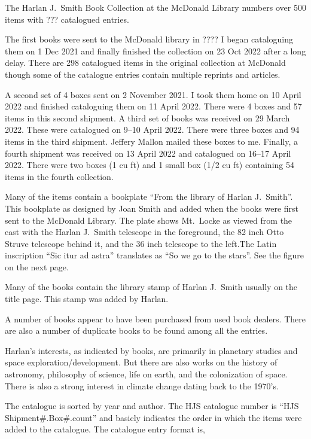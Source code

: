 The Harlan J.~Smith Book Collection at the McDonald Library
numbers over 500 items with ??? catalogued entries.

The first books were sent to the McDonald library in ????  I began
cataloguing them on 1 Dec 2021 and finally finished the collection on
23 Oct 2022 after a long delay. There are 298 catalogued items in the
original collection at McDonald though some of the catalogue entries
contain multiple reprints and articles.

A second set of 4 boxes sent on 2 November 2021.  I took them home on
10 April 2022 and finished cataloguing them on 11 April 2022. There
were 4 boxes and 57 items in this second shipment. A third set of
books was received on 29 March 2022. These were catalogued on 9--10 April
2022. There were three boxes and 94 items in the third
shipment. Jeffery Mallon mailed these boxes to me. Finally, a fourth
shipment was received on 13 April 2022 and catalogued on 16--17 April
2022. There were two boxes (1 cu ft) and 1 small box (1/2 cu ft)
containing 54 items in the fourth collection.

Many of the items contain a bookplate ``From the library of Harlan
J.~Smith''.  This bookplate as designed by Joan Smith and added when
the books were first sent to the McDonald Library. The plate shows
Mt.~Locke as viewed from the east with the Harlan J.~Smith telescope
in the foreground, the 82 inch Otto Struve telescope behind it, and
the 36 inch telescope to the left.The Latin inscription ``Sic itur ad
astra'' translates as ``So we go to the stars''. See the figure on the
next page.

Many of the books contain the library stamp of Harlan J.~Smith usually
on the title page.  This stamp was added by Harlan.

A number of books appear to have been purchased from used book dealers.
There are also a number of duplicate books to be found among all the
entries.

Harlan's interests, as indicated by books, are primarily in planetary
studies and space exploration/development. But there are also works on
the history of astronomy, philosophy of science, life on earth, and the
colonization of space. There is also a strong interest in climate
change dating back to the 1970's.

The catalogue is sorted by year and author. The HJS catalogue number
is ``HJS Shipment\#.Box\#.count'' and basicly indicates the order in
which the items were added to the catalogue. The catalogue entry
format is,
\newline


